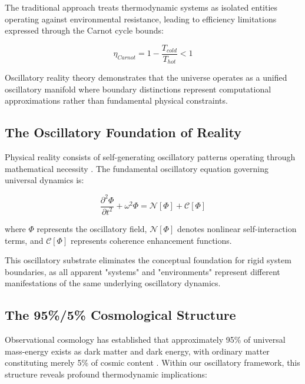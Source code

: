 \documentclass[11pt,a4paper]{article}
\theoremstyle{remark}
\begin{document}
The traditional approach treats thermodynamic systems as isolated entities operating against environmental resistance, leading to efficiency limitations expressed through the Carnot cycle bounds:

\begin{equation}
\eta_{Carnot} = 1 - \frac{T_{cold}}{T_{hot}} < 1
\label{eq:carnot_limit}
\end{equation}

Oscillatory reality theory \cite{sachikonye2024mathematical} demonstrates that the universe operates as a unified oscillatory manifold where boundary distinctions represent computational approximations rather than fundamental physical constraints.

\subsection{The Oscillatory Foundation of Reality}

Physical reality consists of self-generating oscillatory patterns operating through mathematical necessity \cite{sachikonye2024cosmological}. The fundamental oscillatory equation governing universal dynamics is:

\begin{equation}
\frac{\partial^2 \Phi}{\partial t^2} + \omega^2 \Phi = \mathcal{N}[\Phi] + \mathcal{C}[\Phi]
\label{eq:universal_oscillation}
\end{equation}

where $\Phi$ represents the oscillatory field, $\mathcal{N}[\Phi]$ denotes nonlinear self-interaction terms, and $\mathcal{C}[\Phi]$ represents coherence enhancement functions.

This oscillatory substrate eliminates the conceptual foundation for rigid system boundaries, as all apparent "systems" and "environments" represent different manifestations of the same underlying oscillatory dynamics.

\subsection{The 95\%/5\% Cosmological Structure}

Observational cosmology has established that approximately 95\% of universal mass-energy exists as dark matter and dark energy, with ordinary matter constituting merely 5\% of cosmic content \cite{planck2020results}. Within our oscillatory framework, this structure reveals profound thermodynamic implications:
\end{document}
